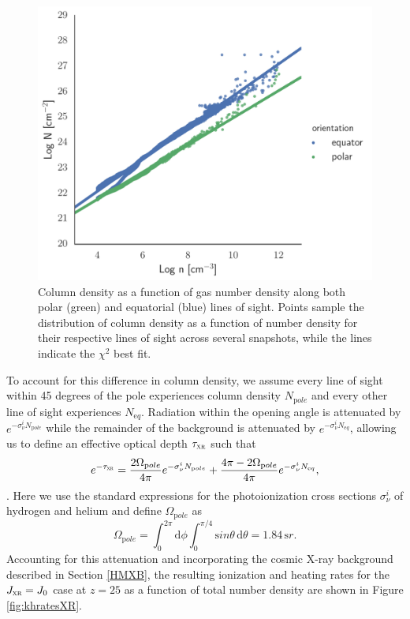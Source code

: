 \documentclass[../thesis.tex]{subfiles}
\begin{document}
\begin{figure}
\begin{center}
\includegraphics[width=\columnwidth]{figures/optical_depth/col_density_fit}
\caption{\label{fig:ncol_fit}
Column density as a function of gas number density along both polar (green) and equatorial (blue) lines of sight.  Points sample the distribution of column density as a function of number density for their respective lines of sight across several snapshots, while the lines indicate the $\chi^2$ best fit.}
\end{center}
\end{figure}

To account for this difference in column density, we assume every line of sight within 45 degrees of the pole \citep{Hosokawaetal2011} experiences column density $N_{\mathrm pole}$ and every other line of sight experiences $N_{\mathrm eq}$. Radiation within the opening angle is attenuated by $e^{-\sigma_{\nu}^i N_{\mathrm pole}}$ while the remainder of the background is attenuated by $e^{-\sigma_{\nu}^i N_{\mathrm eq}}$, allowing us to define an effective optical depth $\tau_{\textsc{xr}}$ such that
\begin{equation}
e^{-\tau_{\textsc{xr}}} = \frac{2 \Omega_{\mathrm pole}}{4\pi} e^{-\sigma_{\nu}^i N_{\mathrm pole}} + \frac{4\pi - 2 \Omega_{\mathrm pole}}{4\pi} e^{-\sigma_{\nu}^i N_{\mathrm eq}},
\end{equation}
\citep[e.g.,][]{ClarkGlover2014}.
Here we use the standard expressions for the photoionization cross sections $\sigma^i_{\nu}$ of hydrogen and helium \citep[e.g.,][]{BarkanaLoeb2001, OsterbrockFerland2006} and define $\Omega_{\mathrm pole}$ as
\begin{equation}
\Omega_{\mathrm pole} = \int_0^{2\pi}{\mathrm d}\phi \int_0^{\pi/4}{\mathrm sin}\theta \,{\mathrm d}\theta
                         = 1.84\,{\mathrm sr}.
\end{equation}
Accounting for this attenuation and incorporating the cosmic X-ray background described in Section \ref{HMXB}, the resulting ionization and heating rates for the $J_{\textsc{xr}}=J_0$ case at $z=25$ as a function of total number density are shown in Figure \ref{fig:khratesXR}.
\end{document}
